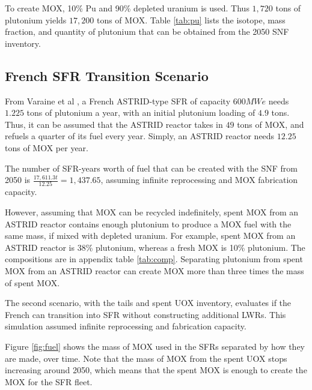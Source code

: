 To create \gls{MOX}, 10\% Pu and 90\% depleted uranium is used.
Thus $1,720$ tons of plutonium yields $17,200$ tons of
\gls{MOX}. Table \ref{tab:pu} lists the isotope, mass fraction,
and quantity of plutonium that can be obtained from the 2050 \gls{SNF} inventory.


\subsection{French \gls{SFR} Transition Scenario}

From Varaine et al \cite{marsaultmarie-sophie_pre-conceptual_2012}, a French
ASTRID-type \gls{SFR} of capacity $600 MWe$ needs $1.225$ tons of
plutonium a year, with an initial plutonium loading of $4.9$ tons.
Thus, it can be assumed that the ASTRID reactor takes in $49$ tons of 
\gls{MOX}, and refuels a quarter of its fuel every year. Simply,
an ASTRID reactor needs $12.25$ tons of \gls{MOX} per year. 

The number of SFR-years worth of fuel that can be created with
the \gls{SNF} from 2050 is $\frac{17,611.3 t}{12.25} = 1,437.65 $,
assuming infinite reprocessing and \gls{MOX} fabrication capacity.

However, assuming that \gls{MOX} can be recycled indefinitely,
spent \gls{MOX} from an ASTRID reactor
contains enough plutonium to produce a \gls{MOX} fuel with
the same mass, if mixed with depleted uranium. For example,
spent \gls{MOX} from an ASTRID reactor is 38\% plutonium,
whereas a fresh \gls{MOX} is 10\% plutonium.
The compositions are in appendix table \ref{tab:comp}.
Separating plutonium from spent \gls{MOX} from
an ASTRID reactor can create \gls{MOX} more than
three times the mass of spent \gls{MOX}.

The second scenario, with the tails and spent \gls{UOX}
inventory, evaluates if the French can transition into \gls{SFR}
without constructing additional \gls{LWR}s. This simulation
assumed infinite reprocessing and fabrication capacity.

Figure \ref{fig:fuel} shows the mass of \gls{MOX} used in the 
\gls{SFR}s separated by how they are made, over time.
Note that the mass of \gls{MOX} from the spent \gls{UOX}
stops increasing around 2050, which means that the spent
\gls{MOX} is enough to create the \gls{MOX} for the
\gls{SFR} fleet. 

